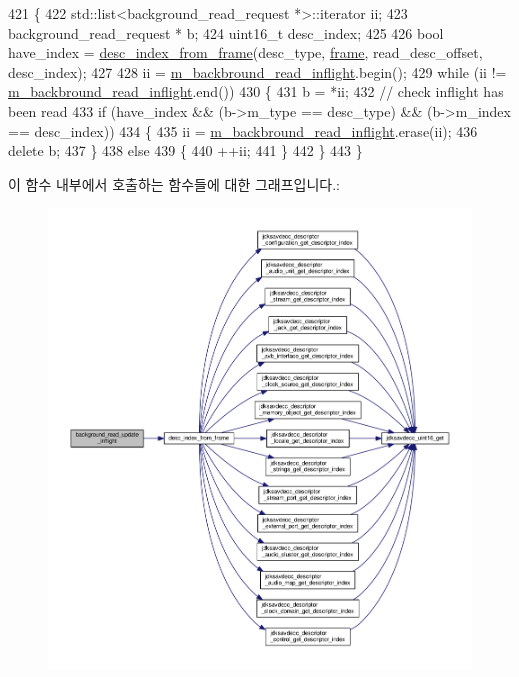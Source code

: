 \begin{DoxyCode}
421 \{
422     std::list<background\_read\_request *>::iterator ii;
423     background\_read\_request * b;
424     uint16\_t desc\_index;
425 
426     \textcolor{keywordtype}{bool} have\_index = \hyperlink{classavdecc__lib_1_1end__station__imp_aa169d9cd63c3e8d588717a7a6f132fde}{desc\_index\_from\_frame}(desc\_type, 
      \hyperlink{gst__avb__playbin_8c_ac8e710e0b5e994c0545d75d69868c6f0}{frame}, read\_desc\_offset, desc\_index);
427 
428     ii = \hyperlink{classavdecc__lib_1_1end__station__imp_adc3620b385a00867b72dbfbcf6c839db}{m\_backbround\_read\_inflight}.begin();
429     \textcolor{keywordflow}{while} (ii != \hyperlink{classavdecc__lib_1_1end__station__imp_adc3620b385a00867b72dbfbcf6c839db}{m\_backbround\_read\_inflight}.end())
430     \{
431         b = *ii;
432         \textcolor{comment}{// check inflight has been read}
433         \textcolor{keywordflow}{if} (have\_index && (b->m\_type == desc\_type) && (b->m\_index == desc\_index))
434         \{
435             ii = \hyperlink{classavdecc__lib_1_1end__station__imp_adc3620b385a00867b72dbfbcf6c839db}{m\_backbround\_read\_inflight}.erase(ii);
436             \textcolor{keyword}{delete} b;
437         \}
438         \textcolor{keywordflow}{else}
439         \{
440             ++ii;
441         \}
442     \}
443 \}
\end{DoxyCode}


이 함수 내부에서 호출하는 함수들에 대한 그래프입니다.\+:
\nopagebreak
\begin{figure}[H]
\begin{center}
\leavevmode
\includegraphics[width=350pt]{classavdecc__lib_1_1end__station__imp_a9ed35744b83a722e59dee6fbf729bf51_cgraph}
\end{center}
\end{figure}




